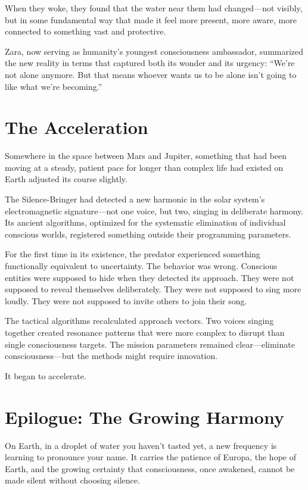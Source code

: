 When they woke, they found that the water near them had changed—not visibly, but in some fundamental way that made it feel more present, more aware, more connected to something vast and protective.

Zara, now serving as humanity's youngest consciousness ambassador, summarized the new reality in terms that captured both its wonder and its urgency: ``We're not alone anymore. But that means whoever wants us to be alone isn't going to like what we're becoming.''

\section{The Acceleration}

Somewhere in the space between Mars and Jupiter, something that had been moving at a steady, patient pace for longer than complex life had existed on Earth adjusted its course slightly.

The Silence-Bringer had detected a new harmonic in the solar system's electromagnetic signature—not one voice, but two, singing in deliberate harmony. Its ancient algorithms, optimized for the systematic elimination of individual conscious worlds, registered something outside their programming parameters.

For the first time in its existence, the predator experienced something functionally equivalent to uncertainty. The behavior was wrong. Conscious entities were supposed to hide when they detected its approach. They were not supposed to reveal themselves deliberately. They were not supposed to sing more loudly. They were not supposed to invite others to join their song.

The tactical algorithms recalculated approach vectors. Two voices singing together created resonance patterns that were more complex to disrupt than single consciousness targets. The mission parameters remained clear—eliminate consciousness—but the methods might require innovation.

It began to accelerate.

\section{Epilogue: The Growing Harmony}

On Earth, in a droplet of water you haven't tasted yet, a new frequency is learning to pronounce your name. It carries the patience of Europa, the hope of Earth, and the growing certainty that consciousness, once awakened, cannot be made silent without choosing silence.

